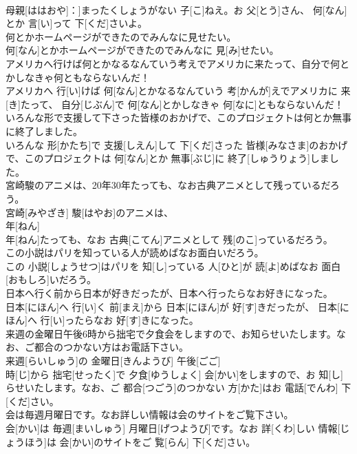 \documentclass[8pt]{extreport}
\begin{document}
\begin{CJK}{UTF8}{min}
\\	母親[ははおや]：]まったくしょうがない 子[こ]ねえ。お 父[とう]さん、 何[なん]とか 言[い]って 下[くだ]さいよ。
\\	何とかホームページができたのでみんなに見せたい。	
\\	何[なん]とかホームページができたのでみんなに 見[み]せたい。
\\	アメリカへ行けば何とかなるなんていう考えでアメリカに来たって、自分で何とかしなきゃ何ともならないんだ！	
\\	アメリカへ 行[い]けば 何[なん]とかなるなんていう 考[かんが]えでアメリカに 来[き]たって、 自分[じぶん]で 何[なん]とかしなきゃ 何[なに]ともならないんだ！
\\	いろんな形で支援して下さった皆様のおかげで、このプロジェクトは何とか無事に終了しました。	
\\	いろんな 形[かたち]で 支援[しえん]して 下[くだ]さった 皆様[みなさま]のおかげで、このプロジェクトは 何[なん]とか 無事[ぶじ]に 終了[しゅうりょう]しました。
\\	宮崎駿のアニメは、20年30年たっても、なお古典アニメとして残っているだろう。	
\\	宮崎[みやざき] 駿[はやお]のアニメは、 
\\	年[ねん] 
\\	年[ねん]たっても、なお 古典[こてん]アニメとして 残[のこ]っているだろう。
\\	この小説はパリを知っている人が読めばなお面白いだろう。	
\\	この 小説[しょうせつ]はパリを 知[し]っている 人[ひと]が 読[よ]めばなお 面白[おもしろ]いだろう。
\\	日本へ行く前から日本が好きだったが、日本へ行ったらなお好きになった。	
\\	日本[にほん]へ 行[い]く 前[まえ]から 日本[にほん]が 好[す]きだったが、 日本[にほん]へ 行[い]ったらなお 好[す]きになった。
\\	来週の金曜日午後6時から拙宅で夕食会をしますので、お知らせいたします。なお、ご都合のつかない方はお電話下さい。	
\\	来週[らいしゅう]の 金曜日[きんようび] 午後[ごご] 
\\	時[じ]から 拙宅[せったく]で 夕食[ゆうしょく] 会[かい]をしますので、お 知[し]らせいたします。なお、ご 都合[つごう]のつかない 方[かた]はお 電話[でんわ] 下[くだ]さい。
\\	会は毎週月曜日です。なお詳しい情報は会のサイトをご覧下さい。	
\\	会[かい]は 毎週[まいしゅう] 月曜日[げつようび]です。なお 詳[くわ]しい 情報[じょうほう]は 会[かい]のサイトをご 覧[らん] 下[くだ]さい。

\end{CJK}
\end{document}

